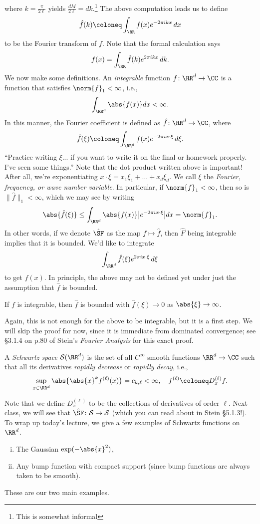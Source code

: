 where $k = \frac{\pi}{2\ell}$ yields $\frac{dM}{2\ell} = dk$.\footnote{This is somewhat informal} The above computation leads us to define
\[ \hat f(k) \coloneq \int_\RR f(x) e^{-2\pi i k x} \, dx \]
to be the Fourier transform of $f$. Note that the formal calculation says
\[ f(x) = \int_\RR \hat f(k) e^{2\pi i k x} \, dk. \]
We now make some definitions. An \textit{integrable} function $f \colon \RR^d \to \CC$ is a function that satisfies $\norm{f}_1 < \infty$, i.e.,
\[ \int_{\RR^d} \abs{f(x)} dx < \infty. \]
In this manner, the Fourier coefficient is defined as $\hat f \colon \RR^d \to \CC$, where
\[ \hat f(\xi) \coloneq \int_{\RR^d} f(x) e^{-2\pi i x \cdot \xi} \, d\xi. \]
``Practice writing $\xi$... if you want to write it on the final or homework properly. I've seen some things.'' Note that the dot product written above is important! After all, we're exponentiating $x \cdot \xi = x_1 \xi_1 + \dots + x_d \xi_d$. We call $\xi$ the \textit{Fourier, frequency, or wave number variable}. In particular, if $\norm{f}_1 < \infty$, then so is $\lVert \hat f \rVert_1 < \infty$, which we may see by writing
\[ \abs{\hat f(\xi)} \leq \int_{\RR^d} \abs{f(x)} \bigl \lvert e^{-2\pi i x \cdot \xi} \bigr \rvert dx = \norm{f}_1. \]
In other words, if we denote $\hat \SF$ as the map $f \mapsto \hat f$, then $\hat F$ being integrable implies that it is bounded. We'd like to integrate
\[ \int_{\RR^d} \hat f(\xi) e^{2\pi i x \cdot \xi} \, d\xi \]
to get $f(x)$. In principle, the above may not be defined yet under just the assumption that $\hat f$ is bounded.
\begin{lemma}
    If $f$ is integrable, then $\hat f$ is bounded with $\hat f(\xi) \to 0$ as $\abs{\xi} \to \infty$.
\end{lemma}
\noindent Again, this is not enough for the above to be integrable, but it is a first step. We will skip the proof for now, since it is immediate from dominated convergence; see \S3.1.4 on p.80 of Stein's \textit{Fourier Analysis} for this exact proof.
\begin{definition}
    A \textit{Schwartz space} $\mathcal S(\RR^d)$ is the set of all $C^\infty$ smooth functions $\RR^d \to \CC$ such that all its derivatives \textit{rapidly decrease} or \textit{rapidly decay}, i.e.,
    \[ \sup_{x \in \RR^d} \abs{\abs{x}^k f^{(\ell)}(x)} = c_{k,\ell} < \infty, \quad f^{(\ell)} \coloneq D_x^{(\ell)} f. \]
\end{definition}
\noindent Note that we define $D_x^{(\ell)}$ to be the collcetions of derivatives of order $\ell$. Next class, we will see that $\hat \SF \colon \mathcal S \to \mathcal S$ (which you can read about in Stein \S5.1.3!). To wrap up today's lecture, we give a few examples of Schwartz functions on $\RR^d$.
\begin{enumerate}[(i)]
    \item The Gaussian $\exp(-\abs{x}^2)$,
    \item Any bump function with compact support (since bump functions are always taken to be smooth).
\end{enumerate}
These are our two main examples.
